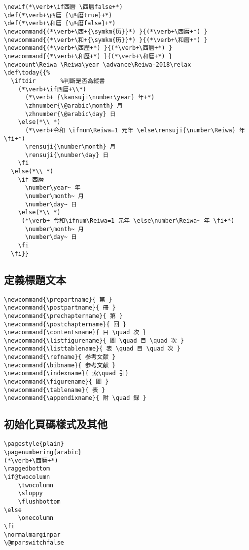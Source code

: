\begin{lstlisting}[firstnumber=1391]
\newif(*\verb+\if西暦 \西暦false+*)
\def(*\verb+\西暦 {\西暦true}+*)
\def(*\verb+\和暦 {\西暦false}+*)
\newcommand{(*\verb+\西+{\symkm{历}}*) }{(*\verb+\西暦+*) }
\newcommand{(*\verb+\和+{\symkm{历}}*) }{(*\verb+\和暦+*) }
\newcommand{(*\verb+\西歷+*) }{(*\verb+\西暦+*) }
\newcommand{(*\verb+\和歷+*) }{(*\verb+\和暦+*) }
\newcount\Reiwa \Reiwa\year \advance\Reiwa-2018\relax
\def\today{{%
  \iftdir		%判斷是否為縱書
    (*\verb+\if西暦+\\*)
      (*\verb+ {\kansuji\number\year} 年+*)
      \zhnumber{\@arabic\month} 月
      \zhnumber{\@arabic\day} 日
    \else(*\\ *)
      (*\verb+令和 \ifnum\Reiwa=1 元年 \else\rensuji{\number\Reiwa} 年 \fi+*)
      \rensuji{\number\month} 月
      \rensuji{\number\day} 日
    \fi
  \else(*\\ *)
    \if 西暦
      \number\year~ 年
      \number\month~ 月
      \number\day~ 日
    \else(*\\ *)
     (*\verb+ 令和\ifnum\Reiwa=1 元年 \else\number\Reiwa~ 年 \fi+*)
      \number\month~ 月
      \number\day~ 日
    \fi
  \fi}}
\end{lstlisting}

\subsection{定義標題文本}

\begin{lstlisting}[firstnumber=1423]
\newcommand{\prepartname}{ 第 }
\newcommand{\postpartname}{ 冊 }
\newcommand{\prechaptername}{ 第 }
\newcommand{\postchaptername}{ 回 }
\newcommand{\contentsname}{ 目 \quad 次 }
\newcommand{\listfigurename}{ 圖 \quad 目 \quad 次 }
\newcommand{\listtablename}{ 表 \quad 目 \quad 次 }
\newcommand{\refname}{ 参考文献 }
\newcommand{\bibname}{ 参考文献 }
\newcommand{\indexname}{ 索\quad 引}
\newcommand{\figurename}{ 圖 }
\newcommand{\tablename}{ 表 }
\newcommand{\appendixname}{ 附 \quad 録 }
\end{lstlisting}

\subsection{初始化頁碼樣式及其他}

\begin{lstlisting}[firstnumber=1433]
\pagestyle{plain}
\pagenumbering{arabic}
(*\verb+\西暦+*)
\raggedbottom
\if@twocolumn
	\twocolumn
	\sloppy
	\flushbottom
\else
	\onecolumn
\fi
\normalmarginpar
\@mparswitchfalse
\end{lstlisting}



